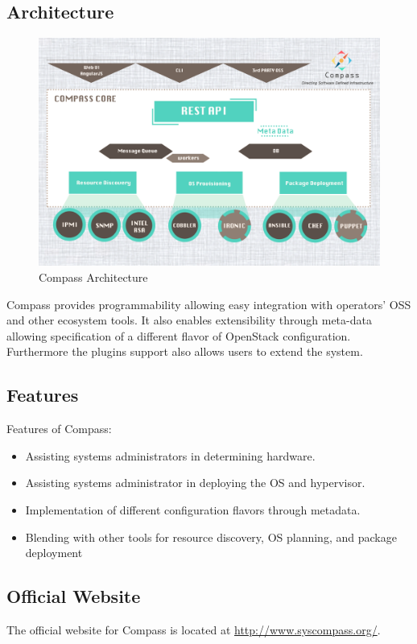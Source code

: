 \documentclass[a4paper, 12pt]{article}
\begin{document}
\subsection{Architecture}

\begin{figure}[H]
	\centering
	\includegraphics[width=\linewidth]{img/compass_arch.png}
  	\caption{Compass Architecture}
	\label{fig:compass_arch}
\end{figure}

Compass provides programmability allowing easy integration with operators’ OSS and other ecosystem tools. It also enables extensibility through meta-data allowing specification of a different flavor of OpenStack configuration. Furthermore the plugins support also allows users to extend the system.

\subsection{Features}
Features of Compass:
\begin{itemize}
\item
Assisting systems administrators in determining hardware.
\item
Assisting systems administrator in deploying the OS and hypervisor.
\item
Implementation of different configuration flavors through metadata.
\item
Blending with other tools for resource discovery, OS planning, and package deployment
\end{itemize}

\subsection{Official Website}
The official website for Compass is located at \href{http://www.syscompass.org/}{http://www.syscompass.org/}.
\end{document}
